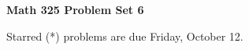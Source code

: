 \documentclass[12pt]{article}
\begin{document}
\def\ctln{\centerline}
\def\msk{\medskip}
\def\bsk{\bigskip}
\def\ssk{\smallskip}
\def\hsk{\hskip.3in}
\def\ra{\rightarrow}
\def\ubr{\underbar}
\def\dsp{\displaystyle}

\def\mt{{\mathcal T}}
\def\mb{{\mathcal B}}
\def\ms{{\mathcal S}}
\def\mu{{\mathcal U}}
\def\mv{{\mathcal V}}

\def\bbr{{\mathbb R}}
\def\bbz{{\mathbb Z}}
\def\bbq{{\mathbb Q}}
\def\bbn{{\mathbb N}}
\def\spc{$~$\hskip.15in$~$}

\def\sset{\subseteq}
\def\del{\partial}
\def\lra{$\Leftrightarrow$}
\def\bra{$\Rightarrow$}




\ctln{\bf Math 325 Problem Set 6}

\msk

\ctln{Starred (*) problems are due Friday, October 12.}
\end{document}
